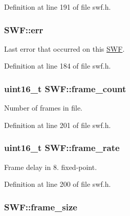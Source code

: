 Definition at line 191 of file swf.\+h.

\hypertarget{struct_s_w_f_afd3f84db8c0aa52bd4923cb23f81ea0b}{}
\subsubsection[{err}]{ S\+W\+F\+::err}\label{struct_s_w_f_afd3f84db8c0aa52bd4923cb23f81ea0b}


Last error that occurred on this \hyperlink{struct_s_w_f}{S\+W\+F}. 



Definition at line 184 of file swf.\+h.

\hypertarget{struct_s_w_f_aad31257e9575ac95fdfdbaaf3505d65b}{}
\subsubsection[{frame\+\_\+count}]{\setlength{\rightskip}{0pt plus 5cm}uint16\+\_\+t S\+W\+F\+::frame\+\_\+count}\label{struct_s_w_f_aad31257e9575ac95fdfdbaaf3505d65b}


Number of frames in file. 



Definition at line 201 of file swf.\+h.

\hypertarget{struct_s_w_f_aa2c564fe1b703896a7970287cc0a131a}{}
\subsubsection[{frame\+\_\+rate}]{\setlength{\rightskip}{0pt plus 5cm}uint16\+\_\+t S\+W\+F\+::frame\+\_\+rate}\label{struct_s_w_f_aa2c564fe1b703896a7970287cc0a131a}


Frame delay in 8. fixed-\/point. 



Definition at line 200 of file swf.\+h.

\hypertarget{struct_s_w_f_afba7a69a7d2cd1fff8fcfd7ed2007c96}{}
\subsubsection[{frame\+\_\+size}]{ S\+W\+F\+::frame\+\_\+size}\label{struct_s_w_f_afba7a69a7d2cd1fff8fcfd7ed2007c96}


